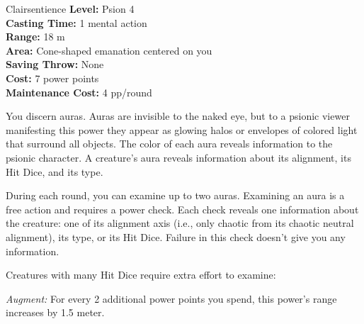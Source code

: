 {Clairsentience}
{
	\textbf{Level:}
	Psion 4\\
	\textbf{Casting Time:}
	1 mental action\\
	\textbf{Range:}
	18 m\\
	\textbf{Area:}
	Cone-shaped emanation centered on you\\
	\textbf{Saving Throw:}
	None\\
	\textbf{Cost:}
	7 power points\\
	\textbf{Maintenance Cost:}
	4 pp/round\\
}
{
	You discern auras. Auras are invisible to the naked eye, but to a psionic viewer manifesting this power they appear as glowing halos or envelopes of colored light that surround all objects. The color of each aura reveals information to the psionic character. A creature's aura reveals information about its alignment, its Hit Dice, and its type.

	During each round, you can examine up to two auras. Examining an aura is a free action and requires a power check. Each check reveals one information about the creature: one of its alignment axis (i.e., only chaotic from its chaotic neutral alignment), its type, or its Hit Dice. Failure in this check doesn't give you any information.

	Creatures with many Hit Dice require extra effort to examine:


	\textit{Augment:} For every 2 additional power points you spend, this power's range increases by 1.5 meter.
}